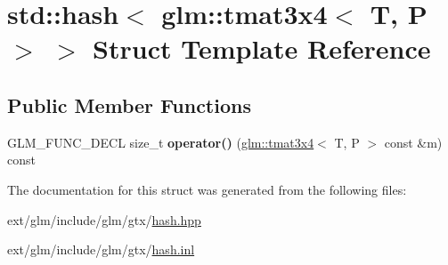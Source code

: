 \hypertarget{structstd_1_1hash_3_01glm_1_1tmat3x4_3_01_t_00_01_p_01_4_01_4}{\section{std\-:\-:hash$<$ glm\-:\-:tmat3x4$<$ T, P $>$ $>$ Struct Template Reference}
\label{structstd_1_1hash_3_01glm_1_1tmat3x4_3_01_t_00_01_p_01_4_01_4}
}
\subsection*{Public Member Functions}
\begin{DoxyCompactItemize}
\item 
\hypertarget{structstd_1_1hash_3_01glm_1_1tmat3x4_3_01_t_00_01_p_01_4_01_4_a4a027732ca977415ce615e8c88632ed3}{G\-L\-M\-\_\-\-F\-U\-N\-C\-\_\-\-D\-E\-C\-L size\-\_\-t {\bfseries operator()} (\hyperlink{structglm_1_1tmat3x4}{glm\-::tmat3x4}$<$ T, P $>$ const \&m) const }\label{structstd_1_1hash_3_01glm_1_1tmat3x4_3_01_t_00_01_p_01_4_01_4_a4a027732ca977415ce615e8c88632ed3}

\end{DoxyCompactItemize}


The documentation for this struct was generated from the following files\-:\begin{DoxyCompactItemize}
\item 
ext/glm/include/glm/gtx/\hyperlink{hash_8hpp}{hash.\-hpp}\item 
ext/glm/include/glm/gtx/\hyperlink{hash_8inl}{hash.\-inl}\end{DoxyCompactItemize}
